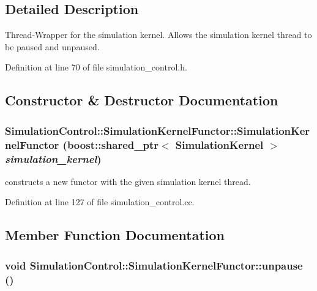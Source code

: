 \subsection{Detailed Description}
Thread-Wrapper for the simulation kernel. Allows the simulation kernel thread to be paused and unpaused. 

Definition at line 70 of file simulation\_\-control.h.

\subsection{Constructor \& Destructor Documentation}
\hypertarget{class_simulation_control_1_1_simulation_kernel_functor_5264e83328beeaafae7e87179614c436}{
\subsubsection[SimulationKernelFunctor]{\setlength{\rightskip}{0pt plus 5cm}SimulationControl::SimulationKernelFunctor::SimulationKernelFunctor (boost::shared\_\-ptr$<$ {\bf SimulationKernel} $>$ {\em simulation\_\-kernel})}}
\label{class_simulation_control_1_1_simulation_kernel_functor_5264e83328beeaafae7e87179614c436}


constructs a new functor with the given simulation kernel thread. 

Definition at line 127 of file simulation\_\-control.cc.

\subsection{Member Function Documentation}
\hypertarget{class_simulation_control_1_1_simulation_kernel_functor_c23f51cedb9c10e346a7bb6a66ed98ab}{
\subsubsection[unpause]{\setlength{\rightskip}{0pt plus 5cm}void SimulationControl::SimulationKernelFunctor::unpause ()}}
\label{class_simulation_control_1_1_simulation_kernel_functor_c23f51cedb9c10e346a7bb6a66ed98ab}


